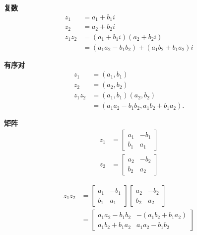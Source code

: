 \begin{tcolorbox}[breakable, enhanced, title = {乘法}]
  \textbf{复数}
  $$
    \begin{aligned}
      z_{1}       & =a_{1}+b_{1} i                                                               \\
      z_{2}       & =a_{2}+b_{2} i                                                               \\
      z_{1} z_{2} & =\left(a_{1}+b_{1} i\right)\left(a_{2}+b_{2} i\right)                        \\
                  & =\left(a_{1} a_{2}-b_{1} b_{2}\right)+\left(a_{1} b_{2}+b_{1} a_{2}\right) i
    \end{aligned}
  $$

  \textbf{有序对}
  $$
    \begin{aligned}
      z_{1}       & =\left(a_{1}, b_{1}\right)                                       \\
      z_{2}       & =\left(a_{2}, b_{2}\right)                                       \\
      z_{1} z_{2} & =\left(a_{1}, b_{1}\right)\left(a_{2}, b_{2}\right)              \\
                  & =\left(a_{1} a_{2}-b_{1} b_{2}, a_{1} b_{2}+b_{1} a_{2}\right) .
    \end{aligned}
  $$

  \textbf{矩阵}
  $$
    \begin{aligned}
      z_{1} & =\left[\begin{array}{ll}
          a_{1} & -b_{1} \\
          b_{1} & a_{1}
        \end{array}\right] \\
      z_{2} & =\left[\begin{array}{cc}
          a_{2} & -b_{2} \\
          b_{2} & a_{2}
        \end{array}\right]
    \end{aligned}
  $$

  $$
    \begin{aligned}
      z_{1} z_{2} & =\left[\begin{array}{cc}
          a_{1} & -b_{1} \\
          b_{1} & a_{1}
        \end{array}\right]\left[\begin{array}{cc}
          a_{2} & -b_{2} \\
          b_{2} & a_{2}
        \end{array}\right] \\
                  & =\left[\begin{array}{cc}
          a_{1} a_{2}-b_{1} b_{2} & -\left(a_{1} b_{2}+b_{1} a_{2}\right) \\
          a_{1} b_{2}+b_{1} a_{2} & a_{1} a_{2}-b_{1} b_{2}
        \end{array}\right]
    \end{aligned}
  $$
\end{tcolorbox}


